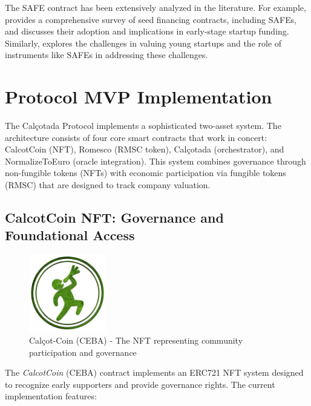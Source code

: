 \documentclass[conference]{IEEEtran}
\begin{document}
The SAFE contract has been extensively analyzed in the literature. For example, \cite{Coyle2019} provides a comprehensive survey of seed financing contracts, including SAFEs, and discusses their adoption and implications in early-stage startup funding. Similarly, \cite{Orcutt2020} explores the challenges in valuing young startups and the role of instruments like SAFEs in addressing these challenges.

\section{Protocol MVP Implementation}



The Calçotada Protocol implements a sophisticated two-asset system. The architecture consists of four core smart contracts that work in concert: CalcotCoin (NFT), Romesco (RMSC token), Calçotada (orchestrator), and NormalizeToEuro (oracle integration). This system combines governance through non-fungible tokens (NFTs) with economic participation via fungible tokens (RMSC) that are designed to track company valuation.

\subsection{CalcotCoin NFT: Governance and Foundational Access}

\begin{figure}[ht]
\centering
\includegraphics[width=0.3\textwidth]{calcot-coin-logo.png}
\caption{Calçot-Coin (CEBA) - The NFT representing community participation and governance}
\label{fig:calcotcoin-logo}
\end{figure}

The \textit{CalcotCoin} (CEBA) contract implements an ERC721 NFT system designed to recognize early supporters and provide governance rights. The current implementation features:
\end{document}

